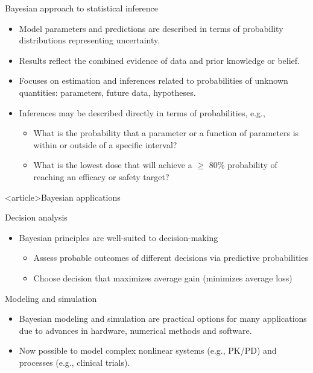 \documentclass[handout]{beamer}
\begin{document}
\begin{frame}{Bayesian approach to statistical inference}

\begin{itemize}
\item Model parameters and predictions are described in terms of probability distributions representing uncertainty.
\item Results reflect the combined evidence of data and prior knowledge or belief.
\item Focuses on estimation and inferences related to probabilities of unknown quantities: parameters, future data, hypotheses.
\item Inferences may be described directly in terms of probabilities, e.g.,
\begin{itemize}
  \item What is the probability that a parameter or a function of parameters is
  within or outside of a specific interval?
  \item What is the lowest dose that will achieve a $\ge$ 80\% probability
    of reaching an efficacy or safety target?
\end{itemize}
\end{itemize}

\end{frame}


\begin{frame}<article>{Bayesian applications}

\begin{block}{Decision analysis}
\begin{itemize}
\item Bayesian principles are well-suited to decision-making
\begin{itemize}
\item  Assess probable outcomes of different decisions via predictive probabilities
\item Choose decision that maximizes average gain (minimizes average loss) 
\end{itemize}
\end{itemize}
\end{block}

\begin{block}{Modeling and simulation}
\begin{itemize}
\item  Bayesian modeling and simulation are practical options for many applications due to advances in hardware, numerical methods and software.
\item Now possible to model complex nonlinear systems (e.g., PK/PD) and processes (e.g., clinical trials).
\end{itemize}
\end{block}

\end{frame}
\end{document}
